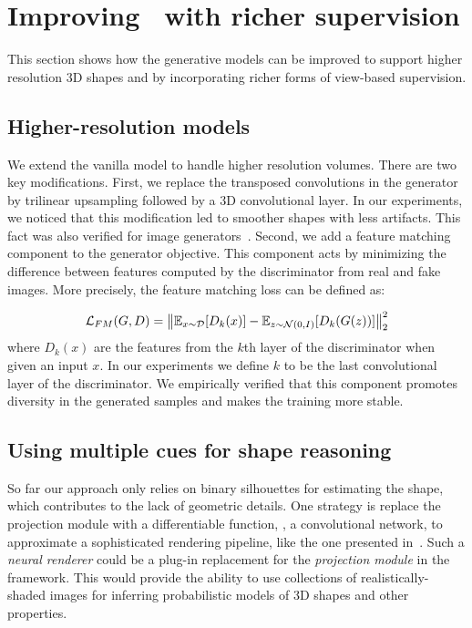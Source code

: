 \section{Improving \prgan~with richer supervision}\label{s:discussion}
This section shows how the generative models can be improved to
support higher resolution 3D shapes and by incorporating richer forms
of view-based supervision.

\subsection{Higher-resolution models}\label{s:hres}
We extend the vanilla \prgan model to handle higher resolution volumes.
There are two key modifications.
First, we replace the transposed convolutions in the generator by 
trilinear upsampling followed by a 3D convolutional layer.
In our experiments, we noticed that this modification led to smoother shapes
with less artifacts.
This fact was also verified for image generators~\cite{odena2016deconvolution}.
Second, we add a feature matching component to the generator objective.
This component acts by minimizing the difference between features computed by
the discriminator from real and fake images.
More precisely, the feature matching loss can be defined as:

\begin{equation}
	\mathcal{L}_{FM}(G, D) = \left\lVert\mathbb{E}_{x \sim \mathcal{D}}[D_k(x)] - 
								 \mathbb{E}_{z \sim \mathcal{N}(0, I)}[D_k(G(z))]\right\rVert_2^2
\end{equation}
where $D_k(x)$ are the features from the $k$th layer of the discriminator when given
an input $x$.
In our experiments we define $k$ to be the last convolutional layer of the discriminator.
We empirically verified that this component promotes diversity in the 
generated samples and makes the training more stable.



\subsection{Using multiple cues for shape reasoning} 
So far our approach only relies on binary silhouettes for estimating
the shape, which contributes to the lack of geometric details.
One strategy is replace the projection module with a differentiable
function, \eg, a convolutional network, to approximate a sophisticated
rendering pipeline, like the one presented in~\cite{RenderNet,nalbach2016deep}. 
Such a \emph{neural renderer} could be a plug-in replacement for the
\emph{projection module} in the \prgan framework.
This would provide the ability to use collections of
realistically-shaded images for inferring probabilistic models of 3D
shapes and other properties.

